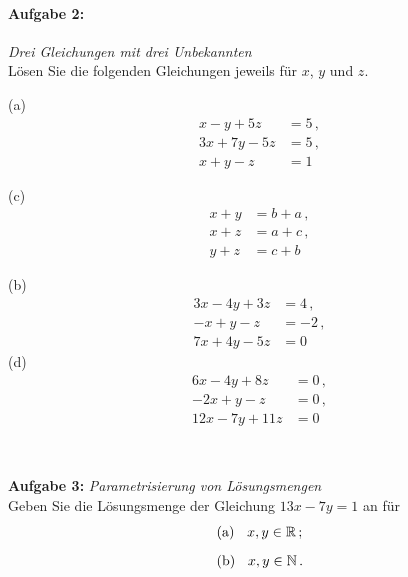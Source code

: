 \paragraph{Aufgabe 2: } \emph{Drei Gleichungen mit drei Unbekannten}\\[0.2cm]
Lösen Sie die folgenden Gleichungen jeweils für $x$, $y$ und $z$. %
%
\begin{center}
\begin{minipage}[t]{0.3\linewidth}
(a)\vspace{-2.7em}
\begin{align*}
    x-y+5z&=5\,,\\
    3x+7y-5z&=5\,,\\
    x+y-z&=1
\end{align*}

(c)\vspace{-2.7em}
\begin{align*}
    x+y&=b+a\,,\\
    x+z&=a+c\,,\\
    y+z&=c+b
\end{align*}
\end{minipage} \hspace{1.5cm}
\begin{minipage}[t]{0.4\linewidth}
%
(b)\vspace{-2.7em}
\begin{align*}
    3x-4y+3z&=4\,,\\
    -x+y-z&=-2\,,\\
    7x+4y-5z&=0
\end{align*}
(d)\vspace{-2.7em}
\begin{align*}
    6x-4y+8z&=0\,, \\
    -2x+y-z&=0\,,\\
    12x-7y+11z&=0
\end{align*}
\end{minipage} \\[0.2cm]
\end{center}
\vspace{0.7cm}

\newpage
% 
\textbf{Aufgabe 3: } \emph{Parametrisierung von Lösungsmengen}\\[0.2cm]
Geben Sie die Lösungsmenge der Gleichung $13x-7y=1$ an für
\begin{align*}
&\text{(a) } \hspace{0.2cm} x,y\in\mathbb{R}\,;\\[0.2cm]
&\text{(b) } \hspace{0.2cm} x,y\in\mathbb{N}\,.
\end{align*}

